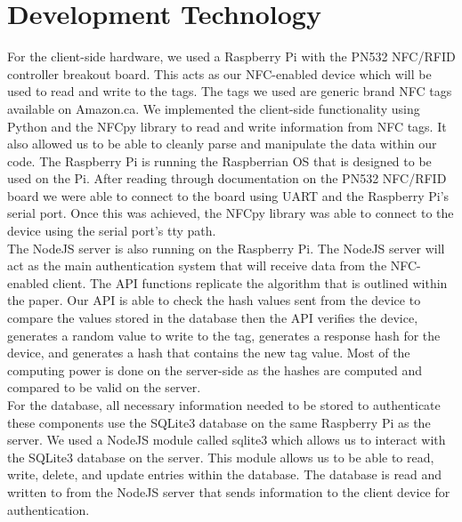 \section{Development Technology}

For the client-side hardware, we used a Raspberry Pi with the PN532 NFC/RFID controller breakout board. This acts as our NFC-enabled device which will be used to read and write to the tags. The tags we used are generic brand NFC tags available on Amazon.ca. We implemented the client-side functionality using Python and the NFCpy library to read and write information from NFC tags. It also allowed us to be able to cleanly parse and manipulate the data within our code. The Raspberry Pi is running the Raspberrian OS that is designed to be used on the Pi. After reading through documentation on the PN532 NFC/RFID board we were able to connect to the board using UART and the Raspberry Pi’s serial port. Once this was achieved, the NFCpy library was able to connect to the device using the serial port’s tty path.\\

The NodeJS server is also running on the Raspberry Pi. The NodeJS server will act as the main authentication system that will receive data from the NFC-enabled client. The API functions replicate the algorithm that is outlined within the paper. Our API is able to check the hash values sent from the device to compare the values stored in the database then the API verifies the device, generates a random value to write to the tag, generates a response hash for the device, and generates a hash that contains the new tag value. Most of the computing power is done on the server-side as the hashes are computed and compared to be valid on the server.\\

For the database, all necessary information needed to be stored to authenticate these components use the SQLite3 database on the same Raspberry Pi as the server. We used a NodeJS module called sqlite3 which allows us to interact with the SQLite3 database on the server. This module allows us to be able to read, write, delete, and update entries within the database. The database is read and written to from the NodeJS server that sends information to the client device for authentication. 
